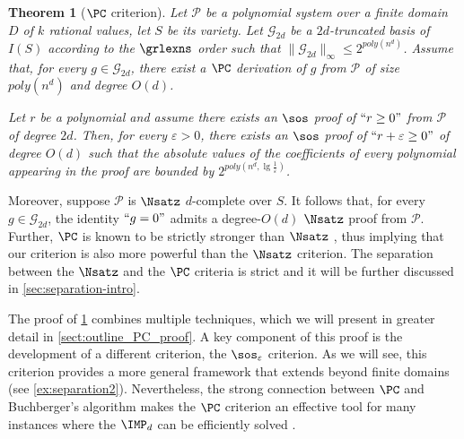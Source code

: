 \documentclass[11pt]{article}
\newtheorem{theorem}{Theorem}[section]
\begin{document}
\begin{theorem}[$\PC$ criterion]\label{th:PC_criterion_introduction}
    Let $\mathcal{P}$ be a polynomial system over a finite domain $D$ of $k$ rational values, let $S$ be its variety. Let $\mathcal{G}_{2d}$ be a $2d$-truncated \GB basis of $I(S)$ according to the $\grlexns$ order such that $\|\mathcal{G}_{2d}\|_{\infty}\leq 2^{poly(n^d)}$. Assume that, for every $g\in \mathcal{G}_{2d}$, there exist a $\PC$ derivation of $g$ from $\mathcal{P}$ of size $poly(n^d)$ and degree $O(d)$. 
    
    Let $r$ be a polynomial and assume there exists an $\sos$ proof of $``r \geq 0"$ from $\mathcal{P}$ of degree $2d$. Then, for every $\varepsilon>0$, there exists an $\sos$ proof of $``r + \varepsilon \geq 0"$ of degree $O(d)$
    such that the absolute values of the coefficients of every polynomial appearing in the proof are bounded by $2^{poly(n^d, \lg \frac{1}{\varepsilon})}$.
\end{theorem}

Moreover, suppose $\mathcal{P}$ is $\Nsatz$ $d$-complete over $S$. It follows that, for every $g \in \mathcal{G}_{2d}$, the identity $``g=0"$ admits a degree-$O(d)$ $\Nsatz$ proof from $\mathcal{P}$. Further, $\PC$ is known to be strictly stronger than $\Nsatz$ \cite{CleggEI96}, thus implying that our criterion is also more powerful than the $\Nsatz$ criterion.
The separation between the $\Nsatz$ and the $\PC$ criteria is strict and it will be further discussed in \cref{sec:separation-intro}.

The proof of \cref{th:PC_criterion_introduction} combines multiple techniques, which we will present in greater detail in \cref{sect:outline_PC_proof}. A key component of this proof is the development of a different criterion, the $\sos_\varepsilon$ criterion. As we will see, this criterion provides a more general framework that extends beyond finite domains (see \cref{ex:separation2}). Nevertheless, the strong connection between $\PC$ and Buchberger's algorithm makes the $\PC$ criterion an effective tool for many instances where the $\IMP_d$ can be efficiently solved \cite{Cox}.

\end{document}
